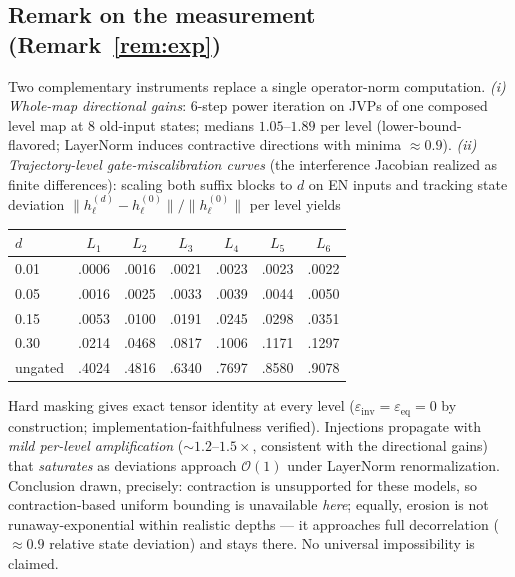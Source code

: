 \documentclass[11pt]{article}
\theoremstyle{definition}\newtheorem{definition}{Definition}
\theoremstyle{remark}\newtheorem{remark}{Remark}
\begin{document}
\subsection{Remark on the measurement (Remark~\ref{rem:exp})}\label{app:meas}
Two complementary instruments replace a single operator-norm computation.
\emph{(i) Whole-map directional gains}: 6-step power iteration on JVPs of one composed
level map at 8 old-input states; medians $1.05$--$1.89$ per level (lower-bound-flavored;
LayerNorm induces contractive directions with minima ${\approx}0.9$).
\emph{(ii) Trajectory-level gate-miscalibration curves} (the interference Jacobian realized
as finite differences): scaling both suffix blocks to $d$ on EN inputs and tracking state
deviation $\|h^{(d)}_\ell-h^{(0)}_\ell\|/\|h^{(0)}_\ell\|$ per level yields

\begin{center}\small
\begin{tabular}{lcccccc}
\toprule
$d$ & $L_1$ & $L_2$ & $L_3$ & $L_4$ & $L_5$ & $L_6$ \\
\midrule
0.01 & .0006 & .0016 & .0021 & .0023 & .0023 & .0022 \\
0.05 & .0016 & .0025 & .0033 & .0039 & .0044 & .0050 \\
0.15 & .0053 & .0100 & .0191 & .0245 & .0298 & .0351 \\
0.30 & .0214 & .0468 & .0817 & .1006 & .1171 & .1297 \\
ungated & .4024 & .4816 & .6340 & .7697 & .8580 & .9078 \\
\bottomrule
\end{tabular}
\end{center}

Hard masking gives exact tensor identity at every level ($\varepsilon_{\mathrm{inv}}
=\varepsilon_{\mathrm{eq}}=0$ by construction; implementation-faithfulness verified).
Injections propagate with \emph{mild per-level amplification} (${\sim}1.2$--$1.5\times$,
consistent with the directional gains) that \emph{saturates} as deviations approach
$\mathcal{O}(1)$ under LayerNorm renormalization. Conclusion drawn, precisely: contraction
is unsupported for these models, so contraction-based uniform bounding is unavailable
\emph{here}; equally, erosion is not runaway-exponential within realistic depths --- it
approaches full decorrelation (${\approx}0.9$ relative state deviation) and stays there.
No universal impossibility is claimed.
\end{document}
